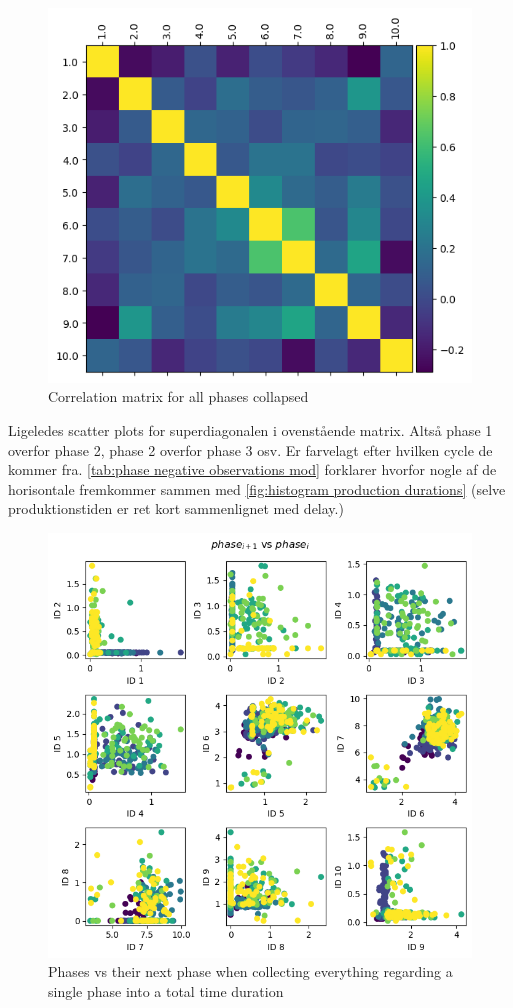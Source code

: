 \documentclass[../Thesis.tex]{subfiles}
\begin{document}
\begin{figure}[H]
    \centering
    \includegraphics[width=.9\linewidth]{figures/Multiple cycles data/Correlation matrix collapsed phases.png}
    \caption{Correlation matrix for all phases collapsed}
\end{figure}


Ligeledes scatter plots for superdiagonalen i ovenstående matrix. Altså phase 1 overfor phase 2, phase 2 overfor phase 3 osv. Er farvelagt efter hvilken cycle de kommer fra. \autoref{tab:phase negative observations mod} forklarer hvorfor nogle af de horisontale fremkommer sammen med \autoref{fig:histogram production durations} (selve produktionstiden er ret kort sammenlignet med delay.)
\begin{figure}[H]
    \centering
    \includegraphics[width=\linewidth]{figures/Multiple cycles data/phase scatter vs next phase.png}
    \caption{Phases vs their next phase when collecting everything regarding a single phase into a total time duration}
\end{figure}
\end{document}
